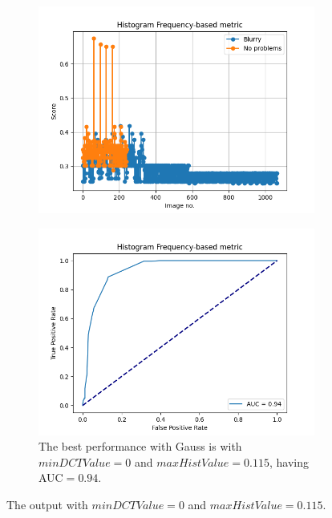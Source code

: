 \begin{figure}[H]
\begin{subfigure}[t]{0.48\textwidth}
    \end{subfigure}\hspace{1em}
    \begin{subfigure}[t]{0.48\textwidth}
        \includegraphics[width=\textwidth]{Figures/tweakHF/gauss_min0_max0.115_output_basic.png}
        \caption{}
        \label{fig:HF_basic_gauss_115}
    \end{subfigure}\hspace{1em}
    \begin{subfigure}[t]{0.48\textwidth}
        \includegraphics[width=\textwidth]{Figures/tweakHF/gauss_min0_max0.115_output_roc.png}
        \caption{The best performance with Gauss is with $minDCTValue=0$ and $maxHistValue=0.115$, having AUC$=0.94$.}
        \label{fig:HF_roc_gauss_115}
    \end{subfigure}
    \caption{The output with $minDCTValue=0$ and $maxHistValue=0.115$.}
    \label{fig:tweakHF}
\end{figure}
